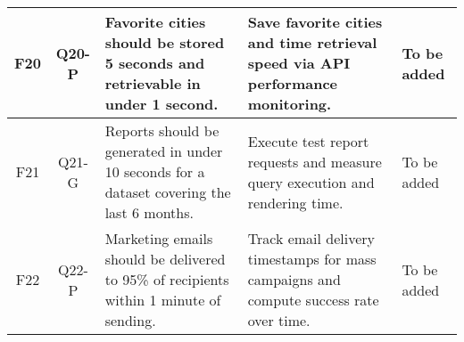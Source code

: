 \begin{longtable}{|c|c|p{4.5cm}|p{3.5cm}|p{3.5cm}|}
    \hline
    F20 & Q20-P & Favorite cities should be stored 5 seconds and retrievable in under 1 second. & Save favorite cities and time retrieval speed via API performance monitoring. & To be added \\
    \hline
    F21 & Q21-G & Reports should be generated in under 10 seconds for a dataset covering the last 6 months. & Execute test report requests and measure query execution and rendering time. & To be added \\
    \hline
    F22 & Q22-P & Marketing emails should be delivered to 95\% of recipients within 1 minute of sending. & Track email delivery timestamps for mass campaigns and compute success rate over time. & To be added \\
    \hline

\end{longtable}

